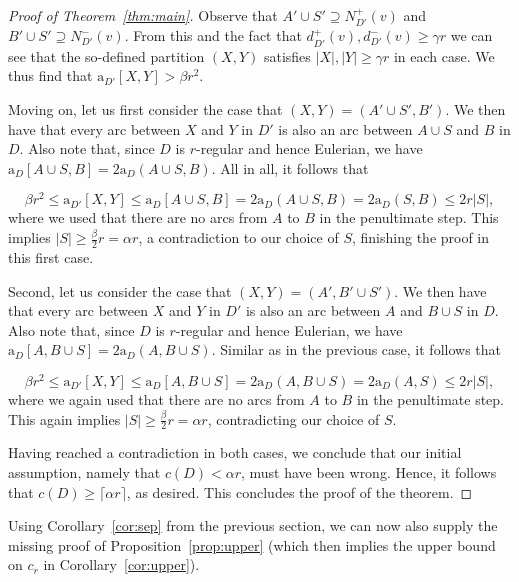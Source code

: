 \documentclass[a4paper,10pt]{article}
\begin{document}
\begin{proof}[Proof of Theorem~\ref{thm:main}]
Observe that $A'\cup S'\supseteq N_{D'}^+(v)$ and $B'\cup S'\supseteq N_{D'}^-(v)$. From this and the fact that $d_{D'}^+(v), d_{D'}^-(v)\ge \gamma r$ we can see that the so-defined partition $(X,Y)$ satisfies $|X|, |Y|\ge \gamma r$ in each case. We thus find that $\mathrm{a}_{D'}[X,Y]> \beta r^2$. 

Moving on, let us first consider the case that $(X,Y)=(A'\cup S',B')$. We then have that every arc between $X$ and $Y$ in $D'$ is also an arc between $A\cup S$ and $B$ in $D$. Also note that, since $D$ is $r$-regular and hence Eulerian, we have
$\mathrm{a}_D[A\cup S,B]=2\mathrm{a}_D(A\cup S,B)$. All in all, it follows that

$$\beta r^2\le \mathrm{a}_{D'}[X,Y]\le \mathrm{a}_D[A\cup S, B]=2\mathrm{a}_D(A\cup S, B)=2\mathrm{a}_D(S,B)\le 2r|S|,$$
 where we used that there are no arcs from $A$ to $B$ in the penultimate step. This implies $|S|\ge \frac{\beta }{2}r=\alpha r$, a contradiction to our choice of $S$, finishing the proof in this first case.

Second, let us consider the case that $(X,Y)=(A',B'\cup S')$. We then have that every arc between $X$ and $Y$ in $D'$ is also an arc between $A$ and $B\cup S$ in $D$. Also note that, since $D$ is $r$-regular and hence Eulerian, we have
$\mathrm{a}_D[A,B\cup S]=2\mathrm{a}_D(A,B\cup S)$. Similar as in the previous case, it follows that

$$\beta r^2\le \mathrm{a}_{D'}[X,Y]\le \mathrm{a}_D[A, B\cup S]=2\mathrm{a}_D(A, B\cup S)=2\mathrm{a}_D(A,S)\le 2r|S|,$$
 where we again used that there are no arcs from $A$ to $B$ in the penultimate step. This again implies $|S|\ge \frac{\beta }{2}r=\alpha r$, contradicting our choice of $S$.

 Having reached a contradiction in both cases, we conclude that our initial assumption, namely that $c(D)<\alpha r$, must have been wrong. Hence, it follows that $c(D)\ge \lceil\alpha r\rceil$, as desired. This concludes the proof of the theorem.
\end{proof}

Using Corollary~\ref{cor:sep} from the previous section, we can now also supply the missing proof of Proposition~\ref{prop:upper} (which then implies the upper bound on $c_r$ in Corollary~\ref{cor:upper}).
\end{document}
